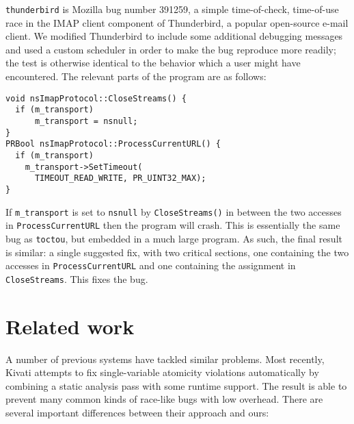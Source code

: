 \documentclass[10pt,letter,twocolumn]{sigplanconf}
\newcommand{\editorial}[1]{}
\begin{document}
\verb|thunderbird| is Mozilla bug number
391259\cite{thunderbird39125}, a simple time-of-check, time-of-use
race in the IMAP client component of Thunderbird, a popular
open-source e-mail client.  We modified Thunderbird to include some
additional debugging messages and used a custom scheduler in order to
make the bug reproduce more readily; the test is otherwise identical
to the behavior which a user might have encountered.  The relevant
parts of the program are as follows:

\begin{verbatim}
void nsImapProtocol::CloseStreams() {
  if (m_transport)
      m_transport = nsnull;
}
PRBool nsImapProtocol::ProcessCurrentURL() {
  if (m_transport)
    m_transport->SetTimeout(
      TIMEOUT_READ_WRITE, PR_UINT32_MAX);
}
\end{verbatim}

\noindent
If \verb|m_transport| is set to \verb|nsnull| by \verb|CloseStreams()|
in between the two accesses in \verb|ProcessCurrentURL| then the
program will crash.  This is essentially the same bug as
\verb|toctou|, but embedded in a much large program.  As such, the
final result is similar: a single suggested fix, with two critical
sections, one containing the two accesses in \verb|ProcessCurrentURL|
and one containing the assignment in \verb|CloseStreams|.  This fixes
the bug.

\section{Related work}\editorial{This is a bit of a bestiary.  Could do with a bit more analysis.}

A number of previous systems have tackled similar problems.  Most
recently, Kivati\cite{Chew2010a} attempts to fix single-variable
atomicity violations automatically by combining a static analysis pass
with some runtime support.  The result is able to prevent many common
kinds of race-like bugs with low overhead.  There are several
important differences between their approach and ours:
\end{document}

